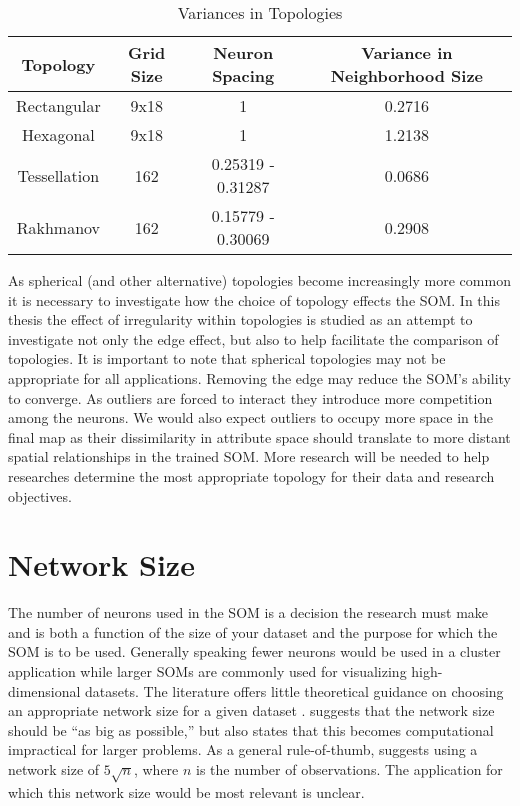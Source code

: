 \begin{table}[htbp]
\caption{Variances in Topologies}
\begin{center}
\begin{tabular}{|c|c|c|c|}
\hline
Topology&Grid Size&Neuron Spacing&Variance in Neighborhood Size\\
\hline
Rectangular&9x18&1&0.2716\\
Hexagonal&9x18&1&1.2138\\
Tessellation&162&0.25319 - 0.31287& 0.0686\\
Rakhmanov&162&0.15779 - 0.30069& 0.2908\\
\hline
\end{tabular}
\end{center}
\label{table1}
\end{table}

As spherical (and other alternative) topologies become
increasingly more common it is necessary to investigate how the choice of
topology effects the SOM.  In this thesis the effect of irregularity within
topologies is studied as an attempt to investigate not only the edge effect,
but also to help facilitate the comparison of topologies.  It is important to
note that spherical topologies may not be appropriate for all applications.
Removing the edge may reduce the SOM's ability to converge.  As outliers are
forced to interact they introduce more competition among the neurons.  We
would also expect outliers to occupy more space in the final map as their
dissimilarity in attribute space should translate to more distant spatial
relationships in the trained SOM.  More research will be needed to help researches
determine the most appropriate topology for their data and research objectives.

\section{Network Size}
\label{bg:size}
The number of neurons used in the SOM is a decision the research must make and
is both a function of the size of your dataset and the purpose for which the
SOM is to be used.  Generally speaking fewer neurons would be used in a
cluster application while larger SOMs are commonly used for visualizing
high-dimensional datasets.  The literature offers little theoretical guidance
on choosing an appropriate network size for a given dataset \citep{cho1996}.
\cite{toolbox} suggests that the network size should be ``as big as
possible,'' but also states that this becomes computational impractical for
larger problems. As a general rule-of-thumb, \citeauthor{toolbox} suggests using a
network size of \(5\sqrt {n}\), where \(n\) is the number of observations. The
application for which this network size would be most relevant is unclear.  

